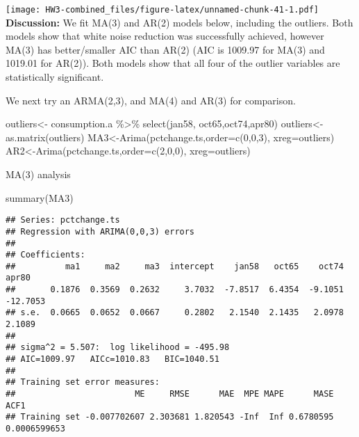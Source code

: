 \documentclass[
]{article}
\newenvironment{Shaded}{\begin{snugshade}}{\end{snugshade}}
\newcommand{\AttributeTok}[1]{\textcolor[rgb]{0.77,0.63,0.00}{#1}}
\newcommand{\DecValTok}[1]{\textcolor[rgb]{0.00,0.00,0.81}{#1}}
\newcommand{\FunctionTok}[1]{\textcolor[rgb]{0.00,0.00,0.00}{#1}}
\newcommand{\NormalTok}[1]{#1}
\newcommand{\OtherTok}[1]{\textcolor[rgb]{0.56,0.35,0.01}{#1}}
\newcommand{\SpecialCharTok}[1]{\textcolor[rgb]{0.00,0.00,0.00}{#1}}
\begin{document}
\texttt{[image: HW3-combined\_files/figure-latex/unnamed-chunk-41-1.pdf]}
\textbf{Discussion:} We fit MA(3) and AR(2) models below, including the
outliers. Both models show that white noise reduction was successfully
achieved, however MA(3) has better/smaller AIC than AR(2) (AIC is
1009.97 for MA(3) and 1019.01 for AR(2)). Both models show that all four
of the outlier variables are statistically significant.

We next try an ARMA(2,3), and MA(4) and AR(3) for comparison.

\begin{Shaded}
\begin{Highlighting}[]
\NormalTok{outliers}\OtherTok{\textless{}{-}}\NormalTok{ consumption.a }\SpecialCharTok{\%\textgreater{}\%} \FunctionTok{select}\NormalTok{(jan58, oct65,oct74,apr80)}
\NormalTok{outliers}\OtherTok{\textless{}{-}} \FunctionTok{as.matrix}\NormalTok{(outliers)}
\NormalTok{MA3}\OtherTok{\textless{}{-}}\FunctionTok{Arima}\NormalTok{(pctchange.ts,}\AttributeTok{order=}\FunctionTok{c}\NormalTok{(}\DecValTok{0}\NormalTok{,}\DecValTok{0}\NormalTok{,}\DecValTok{3}\NormalTok{), }\AttributeTok{xreg=}\NormalTok{outliers)}
\NormalTok{AR2}\OtherTok{\textless{}{-}}\FunctionTok{Arima}\NormalTok{(pctchange.ts,}\AttributeTok{order=}\FunctionTok{c}\NormalTok{(}\DecValTok{2}\NormalTok{,}\DecValTok{0}\NormalTok{,}\DecValTok{0}\NormalTok{), }\AttributeTok{xreg=}\NormalTok{outliers)}
\end{Highlighting}
\end{Shaded}

MA(3) analysis

\begin{Shaded}
\begin{Highlighting}[]
\FunctionTok{summary}\NormalTok{(MA3)}
\end{Highlighting}
\end{Shaded}

\begin{verbatim}
## Series: pctchange.ts 
## Regression with ARIMA(0,0,3) errors 
## 
## Coefficients:
##          ma1     ma2     ma3  intercept    jan58   oct65    oct74     apr80
##       0.1876  0.3569  0.2632     3.7032  -7.8517  6.4354  -9.1051  -12.7053
## s.e.  0.0665  0.0652  0.0667     0.2802   2.1540  2.1435   2.0978    2.1089
## 
## sigma^2 = 5.507:  log likelihood = -495.98
## AIC=1009.97   AICc=1010.83   BIC=1040.51
## 
## Training set error measures:
##                        ME     RMSE      MAE  MPE MAPE      MASE         ACF1
## Training set -0.007702607 2.303681 1.820543 -Inf  Inf 0.6780595 0.0006599653
\end{verbatim}
\end{document}
